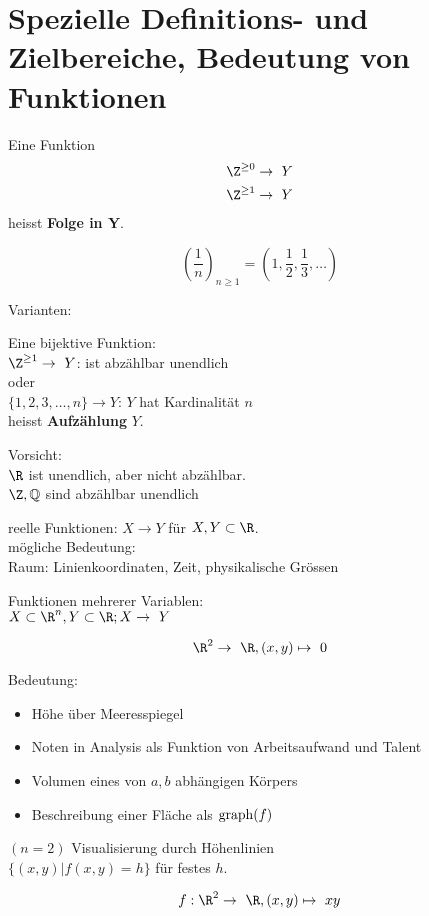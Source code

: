 \section{Spezielle Definitions- und Zielbereiche, Bedeutung von Funktionen}
\begin{def*}[note = Folge , index = Folge]
Eine Funktion
	\begin{gather*}
		\Z^{\geq 0} \rightarrow Y \\
		\Z^{\geq 1} \rightarrow Y
	\end{gather*}
	heisst \textbf{Folge in Y}.\\
\end{def*}
\begin{bsp*}
	\[ \left( \frac{1}{n} \right)_{n \geq 1} = \left( 1 , \frac{1}{2} , \frac{1}{3} , \dotsc \right) \]
\end{bsp*}
Varianten:\\
\begin{def*}[note = Aufzählung , index = Aufzählung]
	Eine bijektive Funktion:\\
	$\Z^{\geq 1} \rightarrow Y$: ist abzählbar unendlich \\
	oder \\
	$\{ 1 , 2 , 3 , \dotsc , n \} \rightarrow Y$: $Y$ hat Kardinalität $n$\\
	heisst \textbf{Aufzählung} $Y$.
\end{def*}
\begin{bem}
	Vorsicht: \\
	$\R$ ist unendlich, aber nicht abzählbar.\\
	$\Z , \Q$ sind abzählbar unendlich
\end{bem}
reelle Funktionen: $X \rightarrow Y$ für $X, Y \subset \R$.\\
mögliche Bedeutung:\\
Raum: Linienkoordinaten, Zeit, physikalische Grössen

Funktionen mehrerer Variablen: \\
$X \subset \R^n , Y \subset \R ; X \rightarrow Y$\\
\begin{bsp*}
	\[ \R^2 \rightarrow \R , (x,y) \mapsto 0 \]
\end{bsp*}
Bedeutung:
\begin{itemize}
	\item Höhe über Meeresspiegel
	\item Noten in Analysis als Funktion von Arbeitsaufwand und Talent
	\item Volumen eines von $a,b$ abhängigen Körpers
	\item Beschreibung einer Fläche als $\operatorname{graph}(f)$
\end{itemize}
$(n=2)$ Visualisierung durch Höhenlinien\\
$\{ (x,y) | f(x,y) = h \}$ für festes $h$.\\
\begin{bsp*}
	\[ f: \R^2 \rightarrow \R , (x,y) \mapsto xy \]
\end{bsp*}

